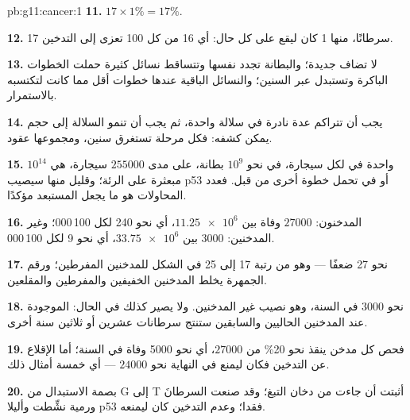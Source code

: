 \begin{solution}{pb:g11:cancer:1}
\textbf{11.} $17 \times 1\% = 17\%$.

\textbf{12.} 17 سرطانًا، منها 1 كان ليقع على كل حال: أي 16 من كل 100
تعزى إلى التدخين.

\textbf{13.} لا تضاف  جديدة؛ والبطانة تجدد نفسها وتتساقط نسائل
كثيرة حملت الخطوات الباكرة وتستبدل عبر السنين؛ والنسائل الباقية عندها
خطوات أقل مما كانت لتكتسبه بالاستمرار.

\textbf{14.} يجب أن تتراكم عدة  نادرة في سلالة واحدة، ثم يجب أن
تنمو السلالة إلى حجم يمكن كشفه: فكل مرحلة تستغرق سنين، ومجموعها عقود.

\textbf{15.}  واحدة في  لكل سيجارة، في نحو $10^9$ 
بطانة، على مدى $\num{255000}$ سيجارة، هي $10^{14}$  مبعثرة على
الرئة؛ وقليل منها سيصيب p53 أو  في  تحمل خطوة
أخرى من قبل. فعدد المحاولات هو ما يجعل المستبعد مؤكدًا.

\textbf{16.} المدخنون: $\num{27000}$ وفاة بين $\num{11.25e6}$، أي نحو
240 لكل 100\,000؛ وغير المدخنين: 3000 بين $\num{33.75e6}$، أي نحو 9
لكل 100\,000.

\textbf{17.} نحو 27 ضعفًا --- وهو من رتبة 17 إلى 25 في الشكل للمدخنين
المفرطين؛ ورقم الجمهرة يخلط المدخنين الخفيفين والمفرطين والمقلعين.

\textbf{18.} نحو 3000 في السنة، وهو نصيب غير المدخنين. ولا يصير كذلك
في الحال:  الموجودة عند المدخنين الحاليين والسابقين ستنتج
سرطانات عشرين أو ثلاثين سنة أخرى.

\textbf{19.} فحص كل مدخن ينقذ نحو 20\% من $\num{27000}$، أي نحو 5000
وفاة في السنة؛ أما الإقلاع عن التدخين فكان ليمنع في النهاية نحو
$\num{24000}$ --- أي خمسة أمثال ذلك.

\textbf{20.} بصمة الاستبدال من G إلى T أثبتت أن   جاءت من
دخان التبغ؛ وقد صنعت السرطانَ  ورمية نشِّطت وأليلا p53 فقدا؛ وعدم
التدخين كان ليمنعه.
\end{solution}
